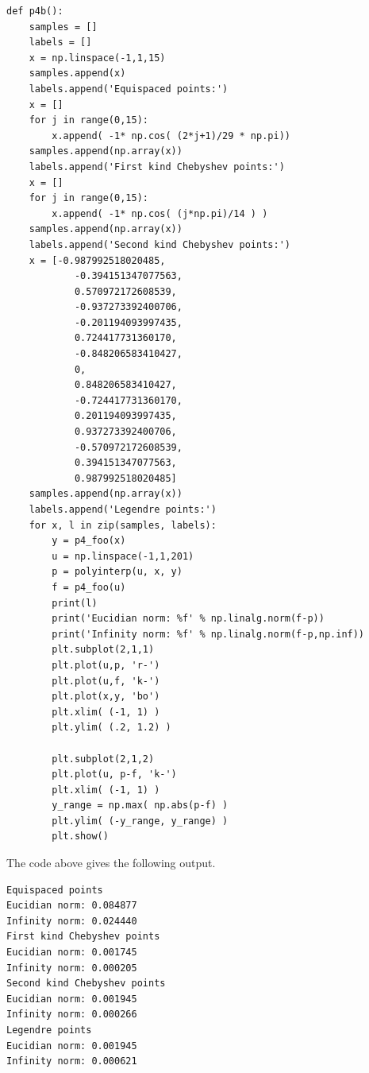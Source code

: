\documentclass[12pt]{article}
\begin{document}
	\begin{lstlisting}
def p4b():
	samples = []
	labels = []
	x = np.linspace(-1,1,15)
	samples.append(x)
	labels.append('Equispaced points:')
	x = []
	for j in range(0,15):
		x.append( -1* np.cos( (2*j+1)/29 * np.pi))
	samples.append(np.array(x))
	labels.append('First kind Chebyshev points:')
	x = []
	for j in range(0,15):
		x.append( -1* np.cos( (j*np.pi)/14 ) )
	samples.append(np.array(x))
	labels.append('Second kind Chebyshev points:')
	x = [-0.987992518020485,
			-0.394151347077563,
			0.570972172608539,
			-0.937273392400706,
			-0.201194093997435,
			0.724417731360170,
			-0.848206583410427,
			0,
			0.848206583410427,
			-0.724417731360170,
			0.201194093997435,
			0.937273392400706,
			-0.570972172608539,
			0.394151347077563,
			0.987992518020485]
	samples.append(np.array(x))
	labels.append('Legendre points:')
	for x, l in zip(samples, labels):
		y = p4_foo(x)
		u = np.linspace(-1,1,201)
		p = polyinterp(u, x, y)
		f = p4_foo(u)
		print(l)
		print('Eucidian norm: %f' % np.linalg.norm(f-p))
		print('Infinity norm: %f' % np.linalg.norm(f-p,np.inf))
		plt.subplot(2,1,1)
		plt.plot(u,p, 'r-')
		plt.plot(u,f, 'k-')
		plt.plot(x,y, 'bo')
		plt.xlim( (-1, 1) )
		plt.ylim( (.2, 1.2) )
		
		plt.subplot(2,1,2)
		plt.plot(u, p-f, 'k-')
		plt.xlim( (-1, 1) )
		y_range = np.max( np.abs(p-f) )
		plt.ylim( (-y_range, y_range) )
		plt.show()
	\end{lstlisting}
	
	The code above gives the following output.
	\begin{lstlisting}
Equispaced points
Eucidian norm: 0.084877
Infinity norm: 0.024440
First kind Chebyshev points
Eucidian norm: 0.001745
Infinity norm: 0.000205
Second kind Chebyshev points
Eucidian norm: 0.001945
Infinity norm: 0.000266
Legendre points
Eucidian norm: 0.001945
Infinity norm: 0.000621
	\end{lstlisting}
	
\end{document}
